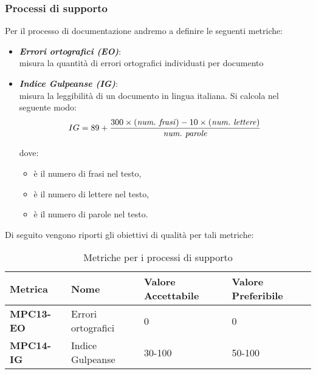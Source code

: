 \subsubsection{Processi di supporto}
Per il processo di documentazione andremo a definire le seguenti metriche:
\begin{itemize}
    \item \textbf{\emph{Errori ortografici (EO)}}:\\
    misura la quantità di errori ortografici individuati per documento
    \item \textbf{\emph{Indice Gulpeanse (IG)}}:\\
    misura la leggibilità di un documento in lingua italiana. Si calcola nel seguente modo:
    \[
    IG = 89 + \frac{300 \times (\text{{\emph{num.\ frasi}}}) - 10 \times (\text{\emph{{num.\ lettere}}})}{\text{\emph{{num.\ parole}}}}
    \]

    dove:
    \begin{itemize}
        \item {} \`e il numero di frasi nel testo,
        \item {} \`e il numero di lettere nel testo,
        \item {} \`e il numero di parole nel testo.
    \end{itemize}
    \end{itemize}
Di seguito vengono riporti gli obiettivi di qualità per tali metriche:
\begin{table}[htbp]
    \centering
    \begin{tabular}{|>{\centering\arraybackslash}p{4cm}|p{4cm}|p{4cm}|p{4cm}|}
    \hline
    \rowcolor{gray!30}
    \textbf{Metrica} & \textbf{Nome} & \textbf{Valore Accettabile} & \textbf{Valore Preferibile} \\
    \hline
    \rowcolor{gray!10}
    \textbf{MPC13-EO} & Errori ortografici & 0 & 0 \\
    \hline
    \rowcolor{gray!10}
    \textbf{MPC14-IG} & Indice Gulpeanse & 30-100 & 50-100 \\
    \hline
    \end{tabular}
    \caption{Metriche per i processi di supporto}
    \label{tab:metriche_fornitura}
\end{table}
\newpage
